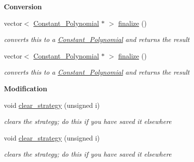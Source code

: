 \begin{Indent}\textbf{ Conversion}\par
\begin{DoxyCompactItemize}
\item 
\mbox{\label{group___g_b_computation_a6f70b5f5779e7aa262d454b9f2bbd2d1}} 
vector$<$ \hyperlink{group__polygroup_class_constant___polynomial}{Constant\+\_\+\+Polynomial} $\ast$ $>$ \hyperlink{group___g_b_computation_a6f70b5f5779e7aa262d454b9f2bbd2d1}{finalize} ()
\begin{DoxyCompactList}\small\item\em converts {\ttfamily this} to a \hyperlink{group__polygroup_class_constant___polynomial}{Constant\+\_\+\+Polynomial} and returns the result \end{DoxyCompactList}\item 
\mbox{\label{group___g_b_computation_acb8721524d3d30e98fe153ed08c21232}} 
vector$<$ \hyperlink{group__polygroup_class_constant___polynomial}{Constant\+\_\+\+Polynomial} $\ast$ $>$ \hyperlink{group___g_b_computation_acb8721524d3d30e98fe153ed08c21232}{finalize} ()
\begin{DoxyCompactList}\small\item\em converts {\ttfamily this} to a \hyperlink{group__polygroup_class_constant___polynomial}{Constant\+\_\+\+Polynomial} and returns the result \end{DoxyCompactList}\end{DoxyCompactItemize}
\end{Indent}
\begin{Indent}\textbf{ Modification}\par
\begin{DoxyCompactItemize}
\item 
\mbox{\label{group___g_b_computation_ac006310b3318fa247fa9a415db495d06}} 
void \hyperlink{group___g_b_computation_ac006310b3318fa247fa9a415db495d06}{clear\+\_\+strategy} (unsigned i)
\begin{DoxyCompactList}\small\item\em clears the strategy; do this if you have saved it elsewhere \end{DoxyCompactList}\item 
\mbox{\label{group___g_b_computation_ac006310b3318fa247fa9a415db495d06}} 
void \hyperlink{group___g_b_computation_ac006310b3318fa247fa9a415db495d06}{clear\+\_\+strategy} (unsigned i)
\begin{DoxyCompactList}\small\item\em clears the strategy; do this if you have saved it elsewhere \end{DoxyCompactList}\end{DoxyCompactItemize}
\end{Indent}
